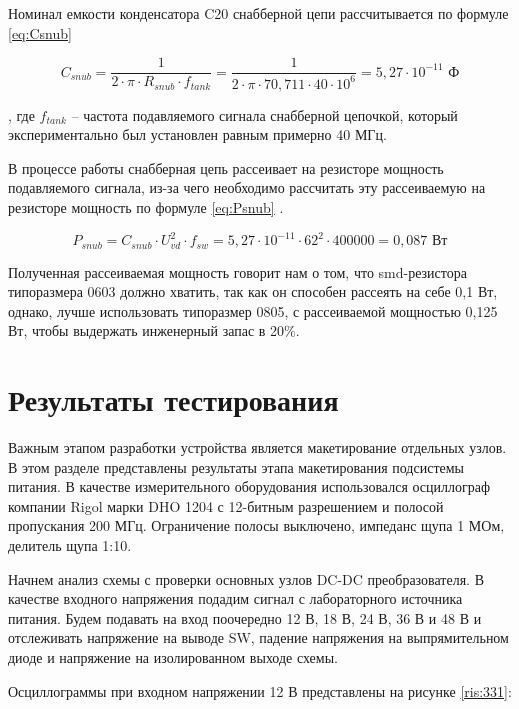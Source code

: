 Номинал емкости конденсатора C20 снабберной цепи рассчитывается по формуле \ref{eq:Csnub}

\begin{equation}
    C_{snub} = \frac{1}{2 \cdot \pi \cdot R_{snub} \cdot f_{tank}} =
    \frac{1}{2 \cdot \pi \cdot 70,711 \cdot 40 \cdot 10^{6}} =
    5,27 \cdot 10^{-11} \text{ Ф}
    \label{eq:Csnub}
 \end{equation}

, где $f_{tank}$ -- частота подавляемого сигнала снабберной цепочкой, который экспериментально был установлен
равным примерно 40 МГц. 

В процессе работы снабберная цепь рассеивает на резисторе мощность подавляемого сигнала, из-за чего необходимо 
рассчитать эту рассеиваемую на резисторе мощность по формуле \ref{eq:Psnub} \cite{Snubber:calculation}. 

\begin{equation}
P_{snub} = C_{snub} \cdot U_{vd}^{2} \cdot f_{sw} =  
5,27 \cdot 10^{-11} \cdot 62^{2} \cdot 400000 =
0,087 \text{ Вт}
\label{eq:Psnub}
\end{equation}

Полученная рассеиваемая мощность говорит нам о том, что smd-резистора типоразмера 0603 должно хватить, так
как он способен рассеять на себе 0,1 Вт, однако, лучше использовать типоразмер 0805, с рассеиваемой 
мощностью 0,125 Вт, чтобы выдержать инженерный запас в 20\%. 

\section{Результаты тестирования}
\hspace{1cm} 

Важным этапом разработки устройства является макетирование отдельных узлов. В этом разделе представлены 
результаты этапа макетирования подсистемы питания. В качестве измерительного оборудования использовался 
осциллограф компании Rigol марки DHO 1204 с 12-битным разрешением и полосой пропускания 200 МГц. Ограничение 
полосы выключено, импеданс щупа 1 МОм, делитель щупа 1:10. 

Начнем анализ схемы с проверки основных узлов DC-DC преобразователя. В качестве входного напряжения подадим
сигнал с лабораторного источника питания. Будем подавать на вход поочередно 12 В, 18 В, 24 В, 36 В и 48 В и 
отслеживать напряжение на выводе SW, падение напряжения на выпрямительном диоде и напряжение на изолированном
выходе схемы. 

Осциллограммы при входном напряжении 12 В представлены на рисунке \ref{ris:331}:

